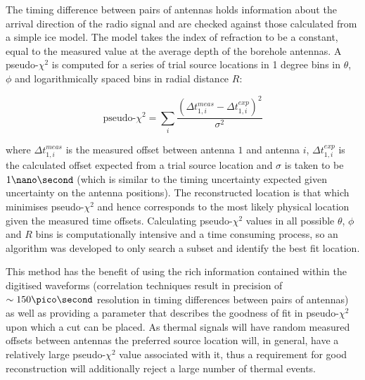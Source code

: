 The timing difference between pairs of antennas holds information about the arrival direction of the radio signal and are checked against those calculated from a simple ice model. The model takes the index of refraction to be a constant, equal to the measured value at the average depth of the borehole antennas. A pseudo-$\chi^{2}$ is computed for a series of trial source locations in 1 degree bins in $\theta$, $\phi$ and logarithmically spaced bins in radial distance $R$:

\begin{equation}
  \mbox{pseudo-}\chi^{2} = \sum_{i} \frac{(\Delta t_{1,i}^{meas} - \Delta t_{1,i}^{exp})^{2}}{\sigma^{2}}
  \label{eq:analysis:Reconstruction:ChiSq}
\end{equation}


\noindent  where $\Delta t_{1,i}^{meas}$ is the measured offset between antenna $1$ and antenna $i$, $\Delta t_{1,i}^{exp}$ is the calculated offset expected from a trial source location and $\sigma$ is taken to be $1 \nano \second$ (which is similar to the timing uncertainty expected given uncertainty on the antenna positions). The reconstructed location is that which minimises pseudo-$\chi^{2}$ and hence corresponds to the most likely physical location given the measured time offsets. Calculating pseudo-$\chi^{2}$ values in all possible $\theta$, $\phi$ and $R$ bins is computationally intensive and a time consuming process, so an algorithm was developed to only search a subset and identify the best fit location.


 This method has the benefit of using the rich information contained within the digitised waveforms (correlation techniques result in precision of $\sim 150 \pico \second$ resolution in timing differences between pairs of antennas) as well as providing a parameter that describes the goodness of fit in pseudo-$\chi^2$ upon which a cut can be placed. As thermal signals will have random measured offsets between antennas the preferred source location will, in general, have a relatively large pseudo-$\chi^2$ value associated with it, thus a requirement for good reconstruction will additionally reject a large number of thermal events.

